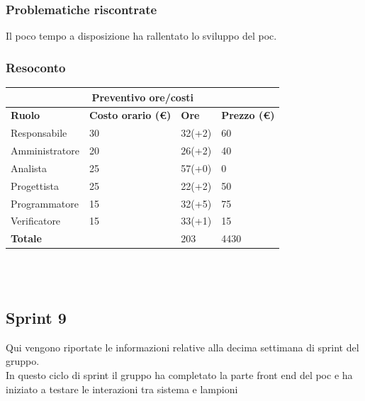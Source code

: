 \documentclass[10pt]{article}
\begin{document}
\subsubsection{Problematiche riscontrate}
Il poco tempo a disposizione ha rallentato lo sviluppo del poc.

\subsubsection{Resoconto}
\begin{center}
	\begin{tabularx}{\textwidth}{|X|X|X|X|}
		\hline
		\multicolumn{4}{|c|}{\textbf{Preventivo ore/costi}}                                      \\
		\hline
		\hline
		\textbf{Ruolo}  & \textbf{Costo orario (\euro)} & \textbf{Ore} & \textbf{Prezzo (\euro)} \\
		\hline
		Responsabile    & 30                            & 32(+2)       & 60                      \\
		\hline
		Amministratore  & 20                            & 26(+2)       & 40                      \\
		\hline
		Analista        & 25                            & 57(+0)       & 0                       \\
		\hline
		Progettista     & 25                            & 22(+2)       & 50                      \\
		\hline
		Programmatore   & 15                            & 32(+5)       & 75                      \\
		\hline
		Verificatore    & 15                            & 33(+1)       & 15                      \\
		\hline
		\hline
		\textbf{Totale} &                               & 203          & 4430                    \\
		\hline
	\end{tabularx}\\[8pt]
	\mbox{}\\
\end{center}


\subsection{Sprint 9}
Qui vengono riportate le informazioni relative alla decima settimana di sprint del gruppo. \\
In questo ciclo di sprint il gruppo ha completato la parte front end del poc e ha iniziato a testare le interazioni tra sistema e lampioni \\
\end{document}
